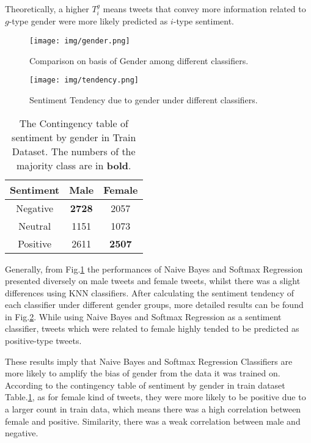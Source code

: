 \documentclass[11pt]{article}
\newcommand{\reffig}[1]{Fig.\ref{#1}}
\newcommand{\reft}[1]{Table.\ref{#1}}
\begin{document}
Theoretically, a higher $T_i^g$ means tweets that convey more information related to  $g$-type gender were more likely predicted as $i$-type sentiment.
\begin{figure}[htbp]
 \centering
\texttt{[image: img/gender.png]}
\caption{Comparison on basis of Gender among different classifiers.}\label{gender}
 \end{figure}
\begin{figure}[htbp]
 \centering
\texttt{[image: img/tendency.png]}
\caption{Sentiment Tendency due to gender under different classifiers.}\label{tendency}
 \end{figure}
\begin{table}[h]
 \begin{center}
\begin{tabular}{ccc}
      \hline
      Sentiment & Male & Female\\
\hline
      Negative &\textbf{2728}&2057\\

       Neutral & 1151&1073\\

       Positive & 2611&\textbf{2507}\\
      \hline
\end{tabular}
\caption{The Contingency table of sentiment by gender in Train Dataset. The numbers of the majority class are in \textbf{bold}. }\label{contingency}
 \end{center}
\end{table}

Generally, from \reffig{gender} the performances of  Naive Bayes and Softmax Regression presented diversely on male tweets and female tweets, whilst there was a slight differences using KNN classifiers. After calculating the sentiment tendency of each classifier under different gender groups, more detailed results can be found in \reffig{tendency}. While using  Naive Bayes and Softmax Regression as a sentiment classifier, tweets which were related to female highly tended to be predicted as positive-type tweets. 

These results imply that Naive Bayes and Softmax Regression Classifiers are more likely to amplify the bias of gender from the data it was trained on. According to the contingency table of sentiment by gender in train dataset \reft{contingency}, as for female kind of tweets, they were more likely to be positive due to a larger count in train data, which means there was a high correlation between female and positive. Similarity, there was a weak correlation between male and negative.
\end{document}
